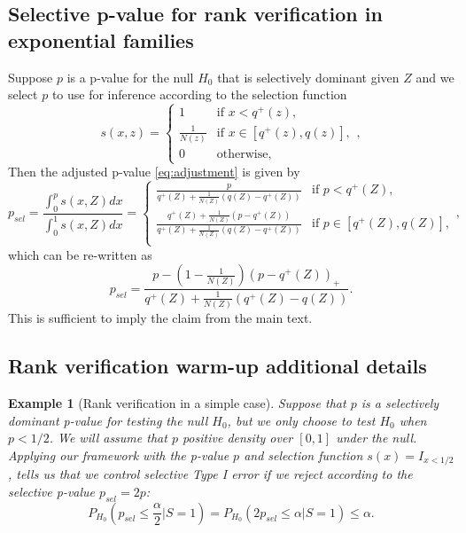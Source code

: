 \documentclass{article}
\newtheorem{example}{Example}
\begin{document}
\begin{appendix}
\subsection{Selective p-value for rank verification in exponential families}
\label{sec:rank_verficiation_adj_appdx}

Suppose $p$ is a p-value for the null $H_0$ that is selectively dominant given $Z$ and we select $p$ to use for inference according to the selection function 
    \begin{equation*}
        s(x, z) = 
        \begin{cases} 
        1 & \text{if } x < q^+(z), \\
        \frac{1}{N(z)} & \text{if } x \in [q^+(z), q(z)], \\
        0 & \text{otherwise},
        \end{cases},
    \end{equation*}
Then the adjusted p-value \eqref{eq:adjustment} is given by 
\begin{equation*}
    p_{sel} = \frac{\int_0^p s(x, Z) dx }{\int_0^1 s(x, Z)dx} = 
        \begin{cases} 
        \frac{p}{q^{+}(Z) + \frac{1}{N(Z)}(q(Z) - q^{+}(Z)) }  & \text{if } p  < q^+(Z), \\
        \frac{q^{+}(Z)+ \frac{1}{N(Z)}(p - q^{+}(Z))}{q^{+}(Z) + \frac{1}{N(Z)}(q(Z) - q^{+}(Z)) } & \text{if } p \in [q^+(Z), q(Z)], \\
        \end{cases},
\end{equation*}
which can be re-written as 
\begin{equation*}
   p_{sel} = \frac{p - (1-\frac{1}{N(Z)})(p - q^+(Z))_+ }{q^+(Z) + \frac{1}{N(Z)}(q^+(Z) - q(Z))}.
\end{equation*}
This is sufficient to imply the claim from the main text. 


\subsection{Rank verification warm-up additional details}
\label{sec:rank_verification_warm_up_appdx}

\begin{example}[Rank verification in a simple case]
    \label{exm:rank_verification}
    Suppose that $p$ is a selectively dominant p-value for testing the null $H_0$, but we only choose to test $H_0$ when $p < 1/2$. We will assume that $p$ positive density over $[0, 1]$ under the null. Applying our framework with the p-value $p$ and selection function $s(x) = I_{x < 1/2}$,  tells us that we control selective Type I error if we reject according to the selective p-value $p_{sel} = 2p$:
    \begin{equation}
        \label{eq:rank_verification_error_control}
        P_{H_{0}}\left(p_{sel} \leq \frac{\alpha}{2} | S = 1\right) = P_{H_{0}}\left(2p_{sel} \leq \alpha | S = 1\right) \leq \alpha.
    \end{equation} 
    

\end{example}
\end{appendix}
\end{document}

